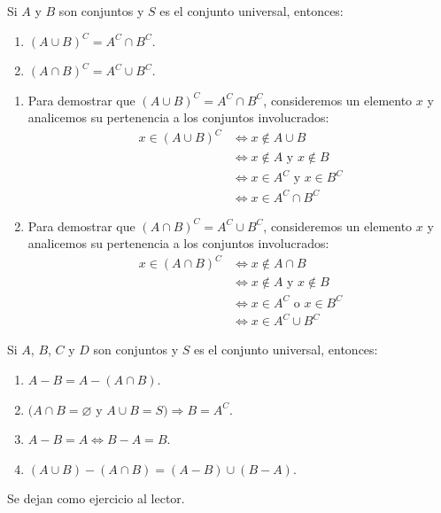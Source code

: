 \begin{theorem}{}{}
    Si $A$ y $B$ son conjuntos y $S$ es el conjunto universal, entonces:
    \begin{enumerate}[label=\roman*., topsep=6pt, itemsep=0pt]
        \item $(A \cup B)^C = A^C \cap B^C$.
        \item $(A \cap B)^C = A^C \cup B^C$.
    \end{enumerate}
    \tcblower
    \demostracion
    \begin{enumerate}[label=\roman*., topsep=6pt, itemsep=0pt]
        \item Para demostrar que $(A \cup B)^C = A^C \cap B^C$, consideremos un elemento $x$ y analicemos su pertenencia a los conjuntos involucrados:
        \begin{align*}
            x \in(A \cup B)^C & \Longleftrightarrow x \notin A \cup B \\ 
            & \Longleftrightarrow x \notin A \text{ y } x \notin B \\ 
            & \Longleftrightarrow  x \in A^C \text { y } x \in B^C \\ 
            & \Longleftrightarrow x \in A^C \cap B^C
        \end{align*}
        \item Para demostrar que $(A \cap B)^C = A^C \cup B^C$, consideremos un elemento $x$ y analicemos su pertenencia a los conjuntos involucrados:
        \begin{align*}
            x \in(A \cap B)^C & \Longleftrightarrow x \notin A \cap B \\ 
            & \Longleftrightarrow x \notin A \text{ y } x \notin B \\ 
            & \Longleftrightarrow  x \in A^C \text { o } x \in B^C \\ 
            & \Longleftrightarrow x \in A^C \cup B^C
        \end{align*}
    \end{enumerate}
\end{theorem}

\begin{prop}{}{}
    Si $A$, $B$, $C$ y $D$ son conjuntos y $S$ es el conjunto universal, entonces:
    \begin{enumerate}[label=\roman*., topsep=6pt, itemsep=0pt]
        \item $A - B = A - (A \cap B)$.
        \item $(A \cap B = \varnothing$ y $A \cup B = S) \Longrightarrow B = A^C$.
        \item $A - B = A \Longleftrightarrow B - A = B$.
        \item $(A \cup B) - (A \cap B) = (A - B) \cup(B - A)$.
    \end{enumerate}
    \tcblower
    \demostracion Se dejan como ejercicio al lector.
\end{prop}

